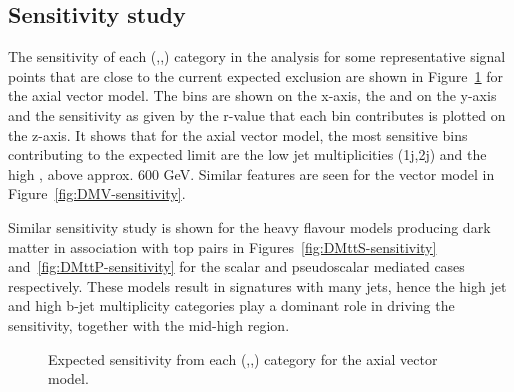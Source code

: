 \clearpage
\subsection{Sensitivity study}
The sensitivity of each (\nj,\nb,\scalht) category in the analysis for some representative signal points that are close to the current expected exclusion are shown in Figure~\ref{fig:DMA-sensitivity} for the axial vector model. The \scalht bins are shown on the x-axis, the \nj and \nb on the y-axis and the sensitivity as given by the r-value that each bin contributes is plotted on the z-axis. 
It shows that for the axial vector model, the most sensitive bins contributing to the expected limit are the low jet multiplicities (1j,2j) and the high \scalht, above approx. 600 GeV. Similar features are seen for the vector model in Figure~\ref{fig:DMV-sensitivity}.

Similar sensitivity study is shown for the heavy flavour models producing dark matter in association with top pairs in Figures~\ref{fig:DMttS-sensitivity} and~\ref{fig:DMttP-sensitivity} for the scalar and pseudoscalar mediated cases respectively. These models result in signatures with many jets, hence the high jet and high b-jet multiplicity categories play a dominant role in driving the sensitivity, together with the mid-high \scalht region. 

\begin{figure}[h!] \centering
{}
\caption{Expected sensitivity from each (\nj,\nb,\scalht) category for the axial vector model.}
\label{fig:DMA-sensitivity} 
\end{figure}

